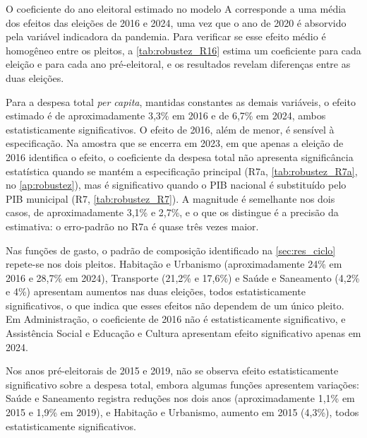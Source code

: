 O coeficiente do ano eleitoral estimado no modelo A corresponde a uma média dos efeitos das eleições de 2016 e 2024, uma vez que o ano de 2020 é absorvido pela variável indicadora da pandemia. Para verificar se esse efeito médio é homogêneo entre os pleitos, a \autoref{tab:robustez_R16} estima um coeficiente para cada eleição e para cada ano pré-eleitoral, e os resultados revelam diferenças entre as duas eleições.

Para a despesa total \textit{per capita}, mantidas constantes as demais variáveis, o efeito estimado é de aproximadamente 3,3\% em 2016 e de 6,7\% em 2024, ambos estatisticamente significativos. O efeito de 2016, além de menor, é sensível à especificação. Na amostra que se encerra em 2023, em que apenas a eleição de 2016 identifica o efeito, o coeficiente da despesa total não apresenta significância estatística quando se mantém a especificação principal (R7a, \autoref{tab:robustez_R7a}, no \autoref{ap:robustez}), mas é significativo quando o PIB nacional é substituído pelo PIB municipal (R7, \autoref{tab:robustez_R7}). A magnitude é semelhante nos dois casos, de aproximadamente 3,1\% e 2,7\%, e o que os distingue é a precisão da estimativa: o erro-padrão no R7a é quase três vezes maior.

Nas funções de gasto, o padrão de composição identificado na \autoref{sec:res_ciclo} repete-se nos dois pleitos. Habitação e Urbanismo (aproximadamente 24\% em 2016 e 28,7\% em 2024), Transporte (21,2\% e 17,6\%) e Saúde e Saneamento (4,2\% e 4\%) apresentam aumentos nas duas eleições, todos estatisticamente significativos, o que indica que esses efeitos não dependem de um único pleito. Em Administração, o coeficiente de 2016 não é estatisticamente significativo, e Assistência Social e Educação e Cultura apresentam efeito significativo apenas em 2024.

Nos anos pré-eleitorais de 2015 e 2019, não se observa efeito estatisticamente significativo sobre a despesa total, embora algumas funções apresentem variações: Saúde e Saneamento registra reduções nos dois anos (aproximadamente 1,1\% em 2015 e 1,9\% em 2019), e Habitação e Urbanismo, aumento em 2015 (4,3\%), todos estatisticamente significativos.

